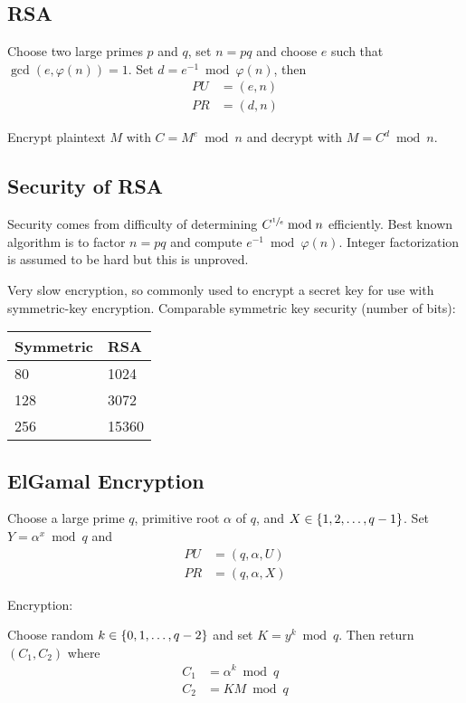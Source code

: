 \documentclass[draft]{article}
\begin{document}
\subsection{RSA}
Choose two large primes $p$ and $q$, set $n=pq$ and choose $e$ such that $\gcd(e, \varphi(n)) = 1$. Set $d=e^{-1}\bmod\varphi(n)$, then
\begin{align*}PU&=(e, n)\\PR&=(d, n)\end{align*}

Encrypt plaintext $M$ with $C=M^e \bmod{n}$ and decrypt with $M = C^d\bmod{n}$.

\subsection{Security of RSA}
Security comes from difficulty of determining $C^{\sfrac{1}{e}}\bmod{n}$ efficiently. Best known algorithm is to factor $n=pq$ and compute $e^{-1}\bmod{\varphi(n)}$. Integer factorization is assumed to be hard but this is unproved.

Very slow encryption, so commonly used to encrypt a secret key for use with symmetric-key encryption. Comparable symmetric key security (number of bits):

\begin{tabular}{ll}
    Symmetric & RSA   \\\toprule
    80        & 1024  \\
    128       & 3072  \\
    256       & 15360 \\\bottomrule
\end{tabular}

\subsection{ElGamal Encryption}
Choose a large prime $q$, primitive root $\alpha$ of $q$, and $X \in \left\lbrace1, 2, \hdots, q - 1\right\rbrace$. Set $Y = \alpha^x\bmod{q}$ and \begin{align*}PU&=(q,\alpha,U)\\PR&=(q,\alpha,X)\end{align*}

Encryption:

Choose random $k\in\left\lbrace0,1,\hdots, q-2\right\rbrace$ and set $K=y^k\bmod{q}$. Then return $(C_1, C_2)$ where \begin{align*}C_1&=\alpha^k\bmod{q}\\C_2&=KM\bmod{q}\end{align*}
\end{document}
